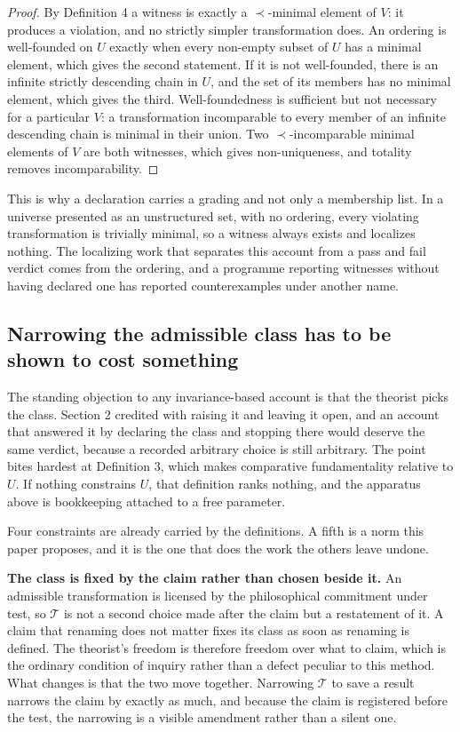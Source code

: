 \documentclass[11pt]{article}
\theoremstyle{remark}
\begin{document}
\begin{proof}
By Definition 4 a witness is exactly a $\prec$-minimal element of $V$: it produces
a violation, and no strictly simpler transformation does. An ordering is
well-founded on $U$ exactly when every non-empty subset of $U$ has a minimal
element, which gives the second statement. If it is not well-founded, there is an
infinite strictly descending chain in $U$, and the set of its members has no
minimal element, which gives the third. Well-foundedness is sufficient but not
necessary for a particular $V$: a transformation incomparable to every member of
an infinite descending chain is minimal in their union. Two $\prec$-incomparable
minimal elements of $V$ are both witnesses, which gives non-uniqueness, and
totality removes incomparability.
\end{proof}

This is why a declaration carries a grading and not only a membership list. In a
universe presented as an unstructured set, with no ordering, every violating
transformation is trivially minimal, so a witness always exists and localizes
nothing. The localizing work that separates this account from a pass and fail
verdict comes from the ordering, and a programme reporting witnesses without
having declared one has reported counterexamples under another name.

\subsection{Narrowing the admissible class has to be shown to cost something}
\label{sec:uconstraint}

The standing objection to any invariance-based account is that the theorist picks
the class. Section 2 credited \citet{nozick2001} with raising it and leaving it
open, and an account that answered it by declaring the class and stopping there
would deserve the same verdict, because a recorded arbitrary choice is still
arbitrary. The point bites hardest at Definition 3, which makes comparative
fundamentality relative to $U$. If nothing constrains $U$, that definition ranks
nothing, and the apparatus above is bookkeeping attached to a free parameter.

Four constraints are already carried by the definitions. A fifth is a norm this
paper proposes, and it is the one that does the work the others leave undone.

\textbf{The class is fixed by the claim rather than chosen beside it.} An
admissible transformation is licensed by the philosophical commitment under test,
so $\mathcal{T}$ is not a second choice made after the claim but a restatement of
it. A claim that renaming does not matter fixes its class as soon as renaming is
defined. The theorist's freedom is therefore freedom over what to claim, which is
the ordinary condition of inquiry rather than a defect peculiar to this method.
What changes is that the two move together. Narrowing $\mathcal{T}$ to save a
result narrows the claim by exactly as much, and because the claim is registered
before the test, the narrowing is a visible amendment rather than a silent one.
\end{document}

